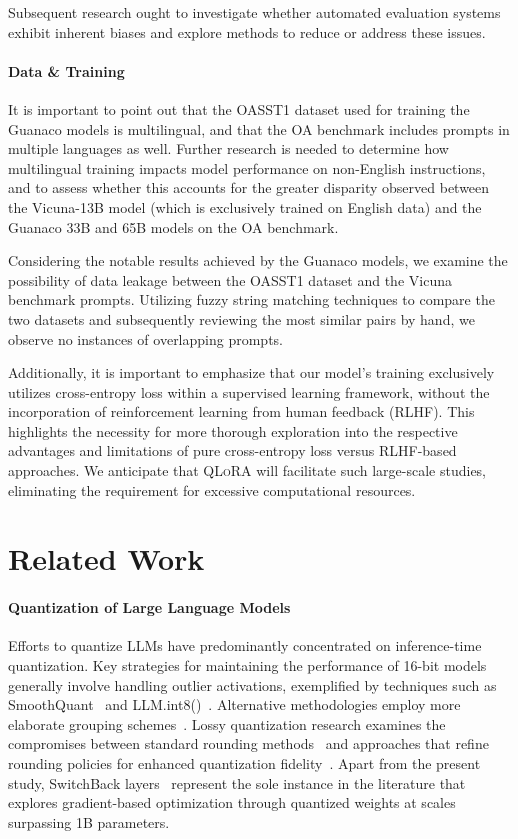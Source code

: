 Subsequent research ought to investigate whether automated evaluation systems exhibit inherent biases and explore methods to reduce or address these issues.

\paragraph{Data \& Training} It is important to point out that the OASST1 dataset used for training the {Guanaco} models is multilingual, and that the OA benchmark includes prompts in multiple languages as well. Further research is needed to determine how multilingual training impacts model performance on non-English instructions, and to assess whether this accounts for the greater disparity observed between the Vicuna-13B model (which is exclusively trained on English data) and the {Guanaco} 33B and 65B models on the OA benchmark.

Considering the notable results achieved by the {Guanaco} models, we examine the possibility of data leakage between the OASST1 dataset and the Vicuna benchmark prompts. Utilizing fuzzy string matching techniques to compare the two datasets and subsequently reviewing the most similar pairs by hand, we observe no instances of overlapping prompts.

Additionally, it is important to emphasize that our model's training exclusively utilizes cross-entropy loss within a supervised learning framework, without the incorporation of reinforcement learning from human feedback (RLHF). This highlights the necessity for more thorough exploration into the respective advantages and limitations of pure cross-entropy loss versus RLHF-based approaches. We anticipate that \textsc{QLoRA} will facilitate such large-scale studies, eliminating the requirement for excessive computational resources.

\section{Related Work}

\paragraph{Quantization of Large Language Models} Efforts to quantize LLMs have predominantly concentrated on inference-time quantization. Key strategies for maintaining the performance of 16-bit models generally involve handling outlier activations, exemplified by techniques such as SmoothQuant~\citep{xiao2022smoothquant} and LLM.int8()~\citep{dettmers2022llm}. Alternative methodologies employ more elaborate grouping schemes~\citep{park2022nuqmm, yao2022zeroquant}. Lossy quantization research examines the compromises between standard rounding methods~\citep{dettmers2022case,zeng2022glm,pope2022efficiently} and approaches that refine rounding policies for enhanced quantization fidelity~\citep{frantar2022gptq}. Apart from the present study, SwitchBack layers~\citep{wortsman2023stable} represent the sole instance in the literature that explores gradient-based optimization through quantized weights at scales surpassing 1B parameters.

